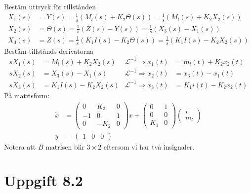 \documentclass[12pt]{article}
\begin{document}
Bestäm uttryck för tillstånden
\begin{align*}
  X_1(s) &= Y(s) = \frac{1}{s}\left(M_l(s) + K_2\Theta(s)\right) = \frac{1}{s}
           \left(
           M_l(s) + K_2 X_2(s)
           \right) \\
  X_2(s) &= \Theta(s) = \frac{1}{s}
           \left(
           Z(s) - Y(s)
           \right) = \frac{1}{s}\left(X_3(s) - X_1(s)\right) \\
  X_3(s) &= Z(s) = \frac{1}{s}
           \left(
           K_1 I(s) - K_2\Theta(s)
           \right) = \frac{1}{s}
           \left(
           K_1 I(s) - K_2 X_2(s)
           \right)
\end{align*}
Bestäm tillstånds derivatorna
\begin{align*}
  sX_1(s) &= M_l(s) + K_2X_2(s) &\mathcal{L}^{-1} \Rightarrow \dot{x}_1(t) &= m_l(t) + K_2x_2(t) \\
  sX_2(s) &= X_3(s) - X_1(s) &\mathcal{L}^{-1} \Rightarrow \dot{x}_2(t) &= x_3(t) - x_1(t) \\
  sX_3(s) &= K_1 I(s) - K_2 X_2(s) &\mathcal{L}^{-1} \Rightarrow \dot{x}_3(t) &= K_1 i(t) - K_2 x_2(t)
\end{align*}
På matrisform:
\begin{align*}
  \dot{x} &=
  \begin{pmatrix}
    0 & K_2 & 0 \\
    -1 & 0 & 1 \\
    0 & -K_2 & 0
  \end{pmatrix}x +
               \begin{pmatrix}
                 0 & 1 \\
                 0 & 0 \\
                 K_1 & 0
               \end{pmatrix}
                       \begin{pmatrix}
                         i \\
                         m_l
                       \end{pmatrix} \\
  y &=
      \begin{pmatrix}
        1 & 0 & 0
      \end{pmatrix}
\end{align*}
Notera att $B$ matrisen blir $3 \times 2$ eftersom vi har två insignaler.

\section*{Uppgift 8.2}
\end{document}
